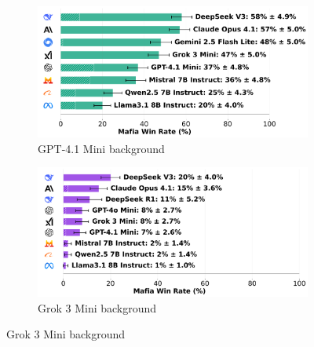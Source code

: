 \documentclass{article}
\begin{document}
\begin{figure}[htbp]
    \centering
    \begin{subfigure}[b]{0.48\textwidth}
        \centering
        \includegraphics[width=\textwidth]{../results/mafioso_gpt-4.1_mini_v4_1_benchmark.png}
        \caption{GPT-4.1 Mini background}
        \label{fig:mafioso_gpt41mini}
    \end{subfigure}
    \hfill
    \begin{subfigure}[b]{0.48\textwidth}
        \centering
        \includegraphics[width=\textwidth]{../results/mafioso_grok_3_mini_v4_1_benchmark.png}
        \caption{Grok 3 Mini background}
        \label{fig:mafioso_grok3}
    \end{subfigure}
    
    \vspace{0.5cm}
    

\end{figure}
\end{document}
